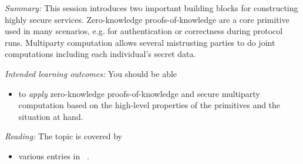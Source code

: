 \emph{Summary:}
This session introduces two important building blocks for constructing highly 
secure services. Zero-knowledge proofs-of-knowledge are a core primitive used 
in many scenarios, e.g. for authentication or correctness during protocol runs. 
Multiparty computation allows several mistrusting parties to do joint 
computations including each individual's secret data.

\emph{Intended learning outcomes:}
You should be able
\begin{itemize}
  \item to \emph{apply} zero-knowledge proofs-of-knowledge and secure 
    multiparty computation based on the high-level properties of the primitives 
    and the situation at hand.
\end{itemize}

\emph{Reading:}
The topic is covered by
\begin{itemize}
  \item various entries in ~\cite{EOCS}.
\end{itemize}

